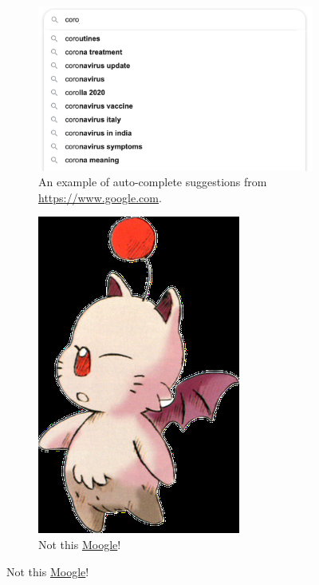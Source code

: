 \documentclass[addpoints]{exam}
\begin{document}
\begin{figure}[h!]
  \centering
  \begin{subfigure}{.7\textwidth}
    \includegraphics[width=\textwidth]{autocomplete}
    \caption{An example of auto-complete suggestions from \url{https://www.google.com}.}
    \label{fig:autocomplete}
  \end{subfigure}
  \begin{subfigure}{.2\textwidth}
    \includegraphics[width=\textwidth]{moogle}
    \caption{Not this \href{https://finalfantasy.fandom.com/wiki/Final_Fantasy_Wiki}{Moogle}!}
    \label{fig:moogle}
  \end{subfigure}
\end{figure}
\end{document}
